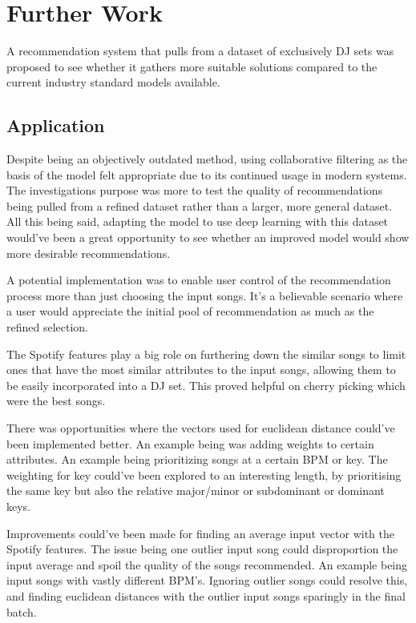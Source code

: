 \section{Further Work}

A recommendation system that pulls from a dataset of exclusively DJ sets was proposed to see whether it gathers more suitable solutions compared to the current industry standard models available. 

\subsection{Application}
Despite being an objectively outdated method, using collaborative filtering as the basis of the model felt appropriate due to its continued usage in modern systems. The investigations purpose was more to test the quality of recommendations being pulled from a refined dataset rather than a larger, more general dataset. All this being said, adapting the model to use deep learning with this dataset would've been a great opportunity to see whether an improved model would show more desirable recommendations.

A potential implementation was to enable user control of the recommendation process more than just choosing the input songs. It's a believable scenario where a user would appreciate the initial pool of recommendation as much as the refined selection.

The Spotify features play a big role on furthering down the similar songs to limit ones that have the most similar attributes to the input songs, allowing them to be easily incorporated into a DJ set. This proved helpful on cherry picking which were the best songs. 

There was opportunities where the vectors used for euclidean distance could've been implemented better. An example being was adding weights to certain attributes. An example being prioritizing songs at a certain BPM or key. The weighting for key could've been explored to an interesting length, by prioritising the same key but also the relative major/minor or subdominant or dominant keys.

Improvements could've been made for finding an average input vector with the Spotify features. The issue being one outlier input song could disproportion the input average and spoil the quality of the songs recommended. An example being input songs with vastly different BPM's. Ignoring outlier songs could resolve this, and finding euclidean distances with the outlier input songs sparingly in the final batch.

